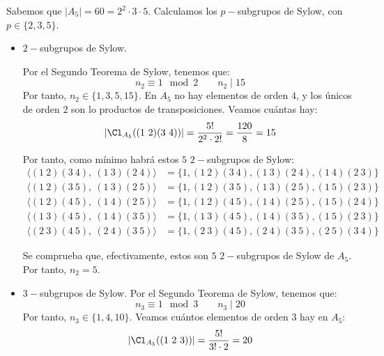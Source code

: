 \begin{ejercicio}
\begin{enumerate}
        Sabemos que $|A_5|=60=2^2\cdot 3\cdot 5$. Calculamos los $p-$subgrupos de Sylow, con $p\in \{2,3,5\}$.
        \begin{itemize}
            \item $2-$subgrupos de Sylow.
            
            Por el Segundo Teorema de Sylow, tenemos que:
            \begin{equation*}
                n_2 \equiv 1 \mod 2 \qquad n_2 \mid 15
            \end{equation*}
            Por tanto, $n_2\in \{1,3,5,15\}$.
            En $A_5$ no hay elementos de orden $4$, y los únicos de orden $2$ son lo productos de transposiciones. Veamos cuántas hay:
            \begin{equation*}
                |\Cl_{A_5}((1\ 2)(3\ 4))| = \frac{5!}{2^2\cdot 2!} = \frac{120}{8} = 15
            \end{equation*}
            
            Por tanto, como mínimo habrá estos $5$ $2-$subgrupos de Sylow:
            \begin{align*}
                \langle (1\ 2)(3\ 4),\ (1\ 3)(2\ 4) \rangle
                &= \{1,(1\ 2)(3\ 4),(1\ 3)(2\ 4),(1\ 4)(2\ 3)\}\\
                \langle (1\ 2)(3\ 5),\ (1\ 3)(2\ 5) \rangle
                &= \{1,(1\ 2)(3\ 5),(1\ 3)(2\ 5),(1\ 5)(2\ 3)\}\\
                \langle (1\ 2)(4\ 5),\ (1\ 4)(2\ 5) \rangle
                &= \{1,(1\ 2)(4\ 5),(1\ 4)(2\ 5),(1\ 5)(2\ 4)\}\\
                \langle (1\ 3)(4\ 5),\ (1\ 4)(3\ 5) \rangle
                &= \{1,(1\ 3)(4\ 5),(1\ 4)(3\ 5),(1\ 5)(2\ 3)\}\\
                \langle (2\ 3)(4\ 5),\ (2\ 4)(3\ 5) \rangle
                &= \{1,(2\ 3)(4\ 5),(2\ 4)(3\ 5),(2\ 5)(3\ 4)\}
            \end{align*}

            Se comprueba que, efectivamente, estos son $5$ $2-$subgrupos de Sylow de $A_5$. Por tanto, $n_2=5$.

            \item $3-$subgrupos de Sylow.
            Por el Segundo Teorema de Sylow, tenemos que:
            \begin{equation*}
                n_3 \equiv 1 \mod 3 \qquad n_3 \mid 20
            \end{equation*}
            Por tanto, $n_3\in \{1,4,10\}$. Veamos cuántos elementos de orden $3$ hay en $A_5$:
            \begin{equation*}
                |\Cl_{A_5}((1\ 2\ 3))| = \frac{5!}{3!\cdot 2} = 20
            \end{equation*}


\end{itemize}
\end{enumerate}
\end{ejercicio}
